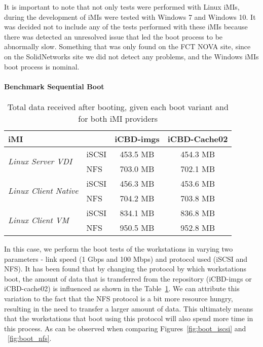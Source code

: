 It is important to note that not only tests were performed with Linux iMIs, during the development of iMIs were tested with Windows 7 and Windows 10. It was decided not to include any of the tests performed with these iMIs because there was detected an unresolved issue that led the boot process to be abnormally slow. Something that was only found on the FCT NOVA site, since on the SolidNetworks site we did not detect any problems, and the Windows iMIs boot process is nominal.




\paragraph{Benchmark Sequential Boot}
\label{par:eval_cache_bootstorm}

\begin{table}[h]
\centering
\begin{tabular}{llcc}
\textbf{iMI} &  & \textbf{iCBD-imgs} & \textbf{iCBD-Cache02} \\ \hline
\multirow{2}{*}{\textit{Linux Server VDI}} & iSCSI & 453.5 MB & 454.3 MB \\
 & NFS & 703.0 MB & 702.1 MB \\ \hline
\multirow{2}{*}{\textit{Linux Client Native}} & iSCSI & 456.3 MB & 453.6 MB \\
 & NFS & 704.2 MB & 703.8 MB \\ \hline
\multirow{2}{*}{\textit{Linux Client VM}} & iSCSI & 834.1 MB & 836.8 MB \\
 & NFS & 950.5 MB & 952.8 MB
\end{tabular}
\caption{Total data received after booting, given each boot variant and for both iMI providers}
\label{tab:boot_totaldata}
\end{table}

In this case, we perform the boot tests of the workstations in varying two parameters - link speed (1 Gbps and 100 Mbps) and protocol used (iSCSI and NFS). It has been found that by changing the protocol by which workstations boot, the amount of data that is transferred from the repository (iCBD-imgs or iCBD-cache02) is influenced as shown in the Table~\ref{tab:boot_totaldata}. We can attribute this variation to the fact that the NFS protocol is a bit more resource hungry, resulting in the need to transfer a larger amount of data. This ultimately means that the workstations that boot using this protocol will also spend more time in this process. As can be observed when comparing Figures~\ref{fig:boot_iscsi} and ~\ref{fig:boot_nfs}.


